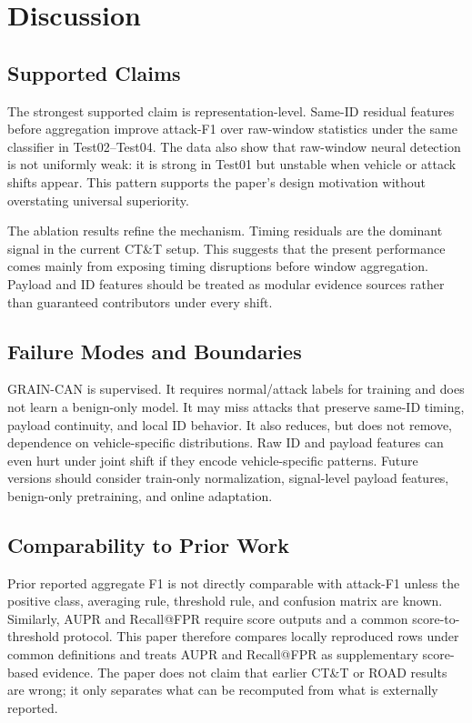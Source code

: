 \documentclass[runningheads]{llncs}
\newcommand{\method}{GRAIN-CAN}
\begin{document}
\FloatBarrier
\section{Discussion}
\subsection{Supported Claims}
The strongest supported claim is representation-level. Same-ID residual features before aggregation improve attack-F1 over raw-window statistics under the same classifier in Test02--Test04. The data also show that raw-window neural detection is not uniformly weak: it is strong in Test01 but unstable when vehicle or attack shifts appear. This pattern supports the paper's design motivation without overstating universal superiority.

The ablation results refine the mechanism. Timing residuals are the dominant signal in the current CT\&T setup. This suggests that the present performance comes mainly from exposing timing disruptions before window aggregation. Payload and ID features should be treated as modular evidence sources rather than guaranteed contributors under every shift.

\subsection{Failure Modes and Boundaries}
\method{} is supervised. It requires normal/attack labels for training and does not learn a benign-only model. It may miss attacks that preserve same-ID timing, payload continuity, and local ID behavior. It also reduces, but does not remove, dependence on vehicle-specific distributions. Raw ID and payload features can even hurt under joint shift if they encode vehicle-specific patterns. Future versions should consider train-only normalization, signal-level payload features, benign-only pretraining, and online adaptation.

\subsection{Comparability to Prior Work}
Prior reported aggregate F1 is not directly comparable with attack-F1 unless the positive class, averaging rule, threshold rule, and confusion matrix are known. Similarly, AUPR and Recall@FPR require score outputs and a common score-to-threshold protocol. This paper therefore compares locally reproduced rows under common definitions and treats AUPR and Recall@FPR as supplementary score-based evidence. The paper does not claim that earlier CT\&T or ROAD results are wrong; it only separates what can be recomputed from what is externally reported.
\end{document}
